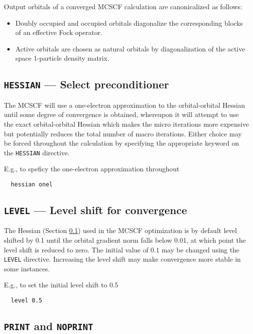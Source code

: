 Output orbitals of a converged MCSCF calculation are canonicalized as
follows:
\begin{itemize}
\item Doubly occupied and occupied orbitals diagonalize the
  corresponding blocks of an effective Fock operator.
\item Active orbitals are chosen as natural orbitals by
  diagonalization of the active space 1-particle density matrix.
\end{itemize}

\subsection{{\tt HESSIAN} --- Select preconditioner}
\label{sec:mcscfhessian}

The MCSCF will use a one-electron approximation to the orbital-orbital
Hessian until some degree of convergence is obtained, whereupon it
will attempt to use the exact orbital-orbital Hessian which makes the
micro iterations more expensive but potentially reduces the total
number of macro iterations.  Either choice may be forced throughout
the calculation by specifying the appropriate keyword on the
\verb+HESSIAN+ directive.

E.g., to speficy the one-electron approximation throughout
\begin{verbatim}
  hessian onel
\end{verbatim}

\subsection{{\tt LEVEL} --- Level shift for convergence}

The Hessian (Section \ref{sec:mcscfhessian}) used in the MCSCF
optimization is by default level shifted by 0.1 until the orbital
gradient norm falls below 0.01, at which point the level shift is
reduced to zero.  The initial value of $0.1$ may be changed using
the \verb+LEVEL+ directive.  Increasing the level shift may make
convergence more stable in some instances.

E.g., to set the initial level shift to 0.5
\begin{verbatim}
  level 0.5
\end{verbatim}

\subsection{{\tt PRINT} and {\tt NOPRINT}}

